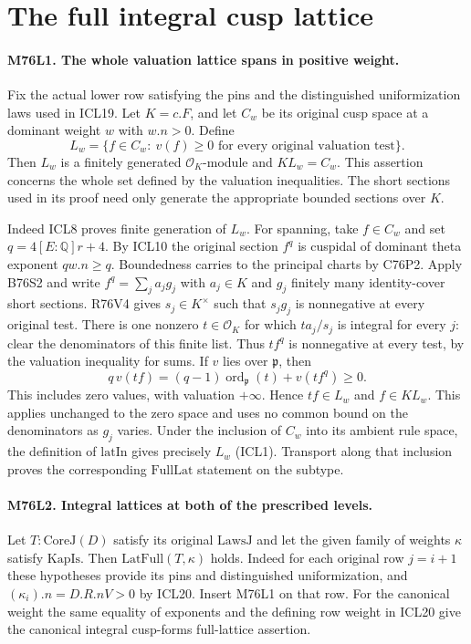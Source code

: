 \section{The full integral cusp lattice}

\paragraph{M76L1. The whole valuation lattice spans in positive weight.}
Fix the actual lower row satisfying the pins and the distinguished
uniformization laws used in ICL19. Let $K=c.F$, and let $C_w$ be its
original cusp space at a dominant weight $w$ with $w.n>0$. Define
\[
 L_w=\{f\in C_w:\ v(f)\ge0\text{ for every original valuation test}\}.
\]
Then $L_w$ is a finitely generated $\mathcal O_K$-module and
$K L_w=C_w$. This assertion concerns the whole set defined by the
valuation inequalities. The short sections used in its proof need
only generate the appropriate bounded sections over $K$.

Indeed ICL8 proves finite generation of $L_w$. For spanning, take
$f\in C_w$ and set $q=4[E:\mathbb Q]r+4$. By ICL10 the original
section $f^q$ is cuspidal of dominant theta exponent $qw.n\ge q$.
Boundedness carries to the principal charts by C76P2. Apply B76S2
and write $f^q=\sum_j a_jg_j$ with $a_j\in K$ and $g_j$ finitely
many identity-cover short sections. R76V4 gives $s_j\in K^\times$
such that $s_jg_j$ is nonnegative at every original test. There
is one nonzero $t\in\mathcal O_K$ for which $ta_j/s_j$ is integral
for every $j$: clear the denominators of this finite list.
Thus $tf^q$ is nonnegative at every test, by the valuation inequality
for sums. If $v$ lies over $\mathfrak p$, then
\[
 q\,v(tf)=(q-1)\operatorname{ord}_{\mathfrak p}(t)+v(tf^q)\ge0.
\]
This includes zero values, with valuation $+\infty$. Hence
$tf\in L_w$ and $f\in K L_w$. This applies unchanged to the zero
space and uses no common bound on the denominators as $g_j$ varies.
Under the inclusion of $C_w$ into its ambient rule space, the
definition of $\mathrm{latIn}$ gives precisely $L_w$ (ICL1).
Transport along that inclusion proves the corresponding
$\mathrm{FullLat}$ statement on the subtype.

\paragraph{M76L2. Integral lattices at both of the prescribed levels.}
Let $T:\mathrm{CoreJ}(D)$ satisfy its original $\mathrm{LawsJ}$
and let the given family of weights $\kappa$ satisfy $\mathrm{KapIs}$.
Then $\mathrm{LatFull}(T,\kappa)$ holds. Indeed for each original
row $j=i+1$ these hypotheses provide its pins and distinguished
uniformization, and $(\kappa_i).n=D.R.nV>0$ by ICL20.
Insert M76L1 on that row. For the canonical weight the same equality
of exponents and the defining row weight in ICL20 give the canonical
integral cusp-forms full-lattice assertion.

